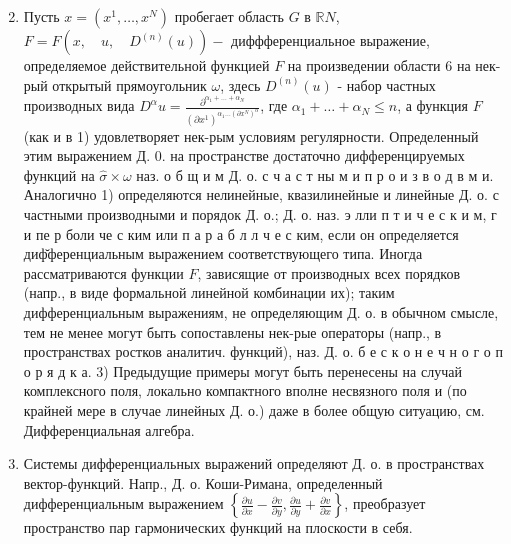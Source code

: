 \documentclass[10pt]{article}
\begin{document}
\begin{enumerate}

  \setcounter{enumi}{1}

  \item Пусть $x=\left(x^{1}, \ldots, x^{N}\right)$ пробегает область $G$ в $\mathbb{R} N$, $F=F\left(x, \quad u, \quad D^{(n)}(u)\right)-$ диффференциальное выражение, определяемое действительной функцией $F$ на произведении области 6 на нек-рый открытый прямоугольник $\omega$, здесь $D^{(n)}(u)$ - набор частных производных вида $D^{\alpha} u=\frac{\partial^{\alpha_{1}+\ldots+\alpha_{N}}}{\left(\partial x^{1}\right)^{\alpha_{1} \ldots\left(\partial x^{N}\right)^{\alpha}}}$, где $\alpha_{1}+\ldots+\alpha_{N} \leqslant n$, а функция $F$ (как и в 1) удовлетворяет нек-рым условиям регулярности. Определенный этим выражением Д. 0. на пространстве достаточно дифференцируемых функций на $\widehat{\sigma} \times \omega$ наз. о б щ и м Д. о. с ч а с т ны м и п р о и з в о д в м и. Аналогично 1) определяются нелинейные, квазилинейные и линейные Д. о. с частными производными и порядок Д. о.; Д. о. наз. э лли п т и ч е с к и м, г и пе р боли че с ким или п а р а б л л ч е с ким, если он определяется диф̆ференциальным выражением соответствующего типа. Иногда рассматриваются функции $F$, зависящие от производных всех порядков (напр., в виде формальной линейной комбинации их); таким дифференциальным выражениям, не определяющим Д. о. в обычном смысле, тем не менее могут быть сопоставлены нек-рые операторы (напр., в пространствах ростков аналитич. функций), наз. Д. о. б е с к о н е ч н о г о п о р я д к а. 3) Предыдущие примеры могут быть перенесены на случай комплексного поля, локально компактного вполне несвязного поля и (по крайней мере в случае линейных Д. о.) даже в более общую ситуацию, см. Дифференциальная алгебра.



  \item Системы дифференциальных выражений определяют Д. о. в пространствах вектор-функций. Напр., Д. о. Коши-Римана, определенный дифференциальным выражением $\left\{\frac{\partial u}{\partial x}-\frac{\partial v}{\partial y}, \frac{\partial u}{\partial y}+\frac{\partial v}{\partial x}\right\}$, преобразует пространство пар гармонических функций на плоскости в себя.



\end{enumerate}
\end{document}
